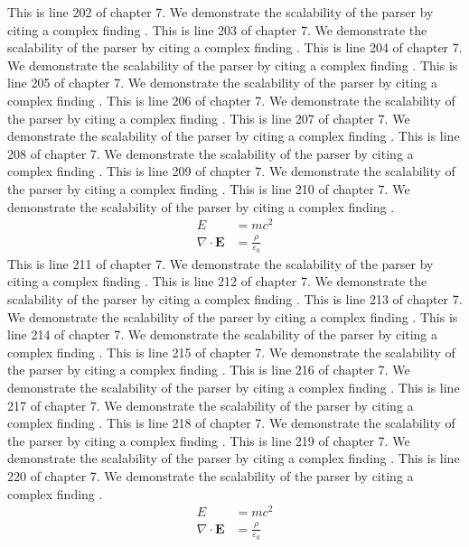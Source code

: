 This is line 202 of chapter 7. We demonstrate the scalability of the parser by citing a complex finding \cite{ref7_202}.
This is line 203 of chapter 7. We demonstrate the scalability of the parser by citing a complex finding \cite{ref7_203}.
This is line 204 of chapter 7. We demonstrate the scalability of the parser by citing a complex finding \cite{ref7_204}.
This is line 205 of chapter 7. We demonstrate the scalability of the parser by citing a complex finding \cite{ref7_205}.
This is line 206 of chapter 7. We demonstrate the scalability of the parser by citing a complex finding \cite{ref7_206}.
This is line 207 of chapter 7. We demonstrate the scalability of the parser by citing a complex finding \cite{ref7_207}.
This is line 208 of chapter 7. We demonstrate the scalability of the parser by citing a complex finding \cite{ref7_208}.
This is line 209 of chapter 7. We demonstrate the scalability of the parser by citing a complex finding \cite{ref7_209}.
This is line 210 of chapter 7. We demonstrate the scalability of the parser by citing a complex finding \cite{ref7_210}.
\begin{align*}
  E &= mc^2 \\
  \nabla \cdot \mathbf{E} &= \frac{\rho}{\varepsilon_0}
\end{align*}
This is line 211 of chapter 7. We demonstrate the scalability of the parser by citing a complex finding \cite{ref7_211}.
This is line 212 of chapter 7. We demonstrate the scalability of the parser by citing a complex finding \cite{ref7_212}.
This is line 213 of chapter 7. We demonstrate the scalability of the parser by citing a complex finding \cite{ref7_213}.
This is line 214 of chapter 7. We demonstrate the scalability of the parser by citing a complex finding \cite{ref7_214}.
This is line 215 of chapter 7. We demonstrate the scalability of the parser by citing a complex finding \cite{ref7_215}.
This is line 216 of chapter 7. We demonstrate the scalability of the parser by citing a complex finding \cite{ref7_216}.
This is line 217 of chapter 7. We demonstrate the scalability of the parser by citing a complex finding \cite{ref7_217}.
This is line 218 of chapter 7. We demonstrate the scalability of the parser by citing a complex finding \cite{ref7_218}.
This is line 219 of chapter 7. We demonstrate the scalability of the parser by citing a complex finding \cite{ref7_219}.
This is line 220 of chapter 7. We demonstrate the scalability of the parser by citing a complex finding \cite{ref7_220}.
\begin{align*}
  E &= mc^2 \\
  \nabla \cdot \mathbf{E} &= \frac{\rho}{\varepsilon_0}
\end{align*}
